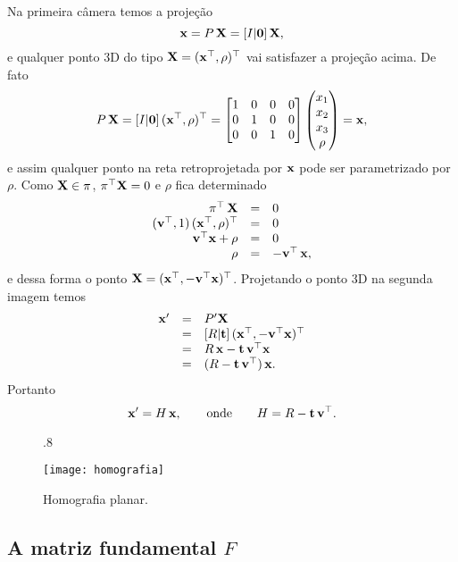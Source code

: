 Na primeira câmera temos a projeção
\begin{equation*}
\mathbf{x}=P\,\mathbf{X}=[I|{\bf 0}]\,\mathbf{X},
\end{equation*}
e qualquer ponto 3D do tipo $\mathbf{X}=(\mathbf{x}^\top,\rho)^\top$ vai satisfazer a projeção acima. De fato
\begin{equation*}
P\,\mathbf{X}=
[I|{\bf 0}]\,(\mathbf{x}^\top,\rho)^\top=
\begin{bmatrix}
1&0&0&0\\
0&1&0&0\\
0&0&1&0
\end{bmatrix}
\begin{pmatrix}
x_1\\
x_2\\
x_3\\
\rho
\end{pmatrix}
=\mathbf{x},
\end{equation*}
e assim qualquer ponto na reta retroprojetada por $\mathbf{x}$ pode ser parametrizado por $\rho$. Como $\mathbf{X}\in\pi$, $\pi^\top\mathbf{X}=0$ e  
$\rho$ fica determinado
\begin{equation*}
\begin{array}{rcl}
\pi^\top\,\mathbf{X}&=&0\\
({\bf v}^\top,1)\,(\mathbf{x}^\top,\rho)^\top&=&0\\
{\bf v}^\top\mathbf{x}+\rho&=&0\\
\rho&=&-{\bf v}^\top\,\mathbf{x},
\end{array}
\end{equation*}
e dessa forma o ponto $\mathbf{X}=(\mathbf{x}^\top,-{\bf v}^\top\mathbf{x})^\top$.
Projetando o ponto 3D na segunda imagem temos
\begin{equation*}
\begin{array}{rcl}
\mathbf{x}'&=&P'\mathbf{X}\\
&=&[R|{\bf t}]\,(\mathbf{x}^\top,-{\bf v}^\top\mathbf{x})^\top\\
&=&R\,\mathbf{x}-{\bf t}\,{\bf v}^\top\mathbf{x}\\
&=&(R-{\bf t}\,{\bf v}^\top)\,\mathbf{x}.
\end{array}
\end{equation*}
Portanto
\begin{equation*}
\mathbf{x}'=H\,\mathbf{x},\qquad\text{onde}\qquad H=R-{\bf t}\,{\bf v}^\top.
\end{equation*}
\begin{figure}[!htb]{.8\textwidth}
\caption{Homografia planar.}
\texttt{[image: homografia]}
\label{fig.homografia}
\end{figure}
\subsection{A matriz fundamental $F$}\label{sec.matriz-F}

